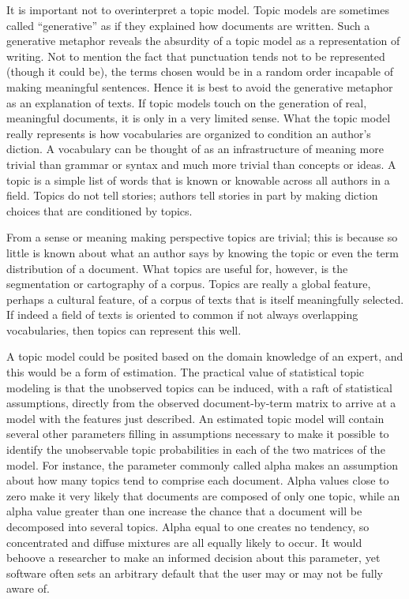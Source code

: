\documentclass[]{book}
\theoremstyle{definition}
\theoremstyle{definition}
\theoremstyle{definition}
\theoremstyle{remark}
\begin{document}
It is important not to overinterpret a topic model. Topic models are
sometimes called ``generative'' as if they explained how documents are
written. Such a generative metaphor reveals the absurdity of a topic
model as a representation of writing. Not to mention the fact that
punctuation tends not to be represented (though it could be), the terms
chosen would be in a random order incapable of making meaningful
sentences. Hence it is best to avoid the generative metaphor as an
explanation of texts. If topic models touch on the generation of real,
meaningful documents, it is only in a very limited sense. What the topic
model really represents is how vocabularies are organized to condition
an author's diction. A vocabulary can be thought of as an infrastructure
of meaning more trivial than grammar or syntax and much more trivial
than concepts or ideas. A topic is a simple list of words that is known
or knowable across all authors in a field. Topics do not tell stories;
authors tell stories in part by making diction choices that are
conditioned by topics.

From a sense or meaning making perspective topics are trivial; this is
because so little is known about what an author says by knowing the
topic or even the term distribution of a document. What topics are
useful for, however, is the segmentation or cartography of a corpus.
Topics are really a global feature, perhaps a cultural feature, of a
corpus of texts that is itself meaningfully selected. If indeed a field
of texts is oriented to common if not always overlapping vocabularies,
then topics can represent this well.

A topic model could be posited based on the domain knowledge of an
expert, and this would be a form of estimation. The practical value of
statistical topic modeling is that the unobserved topics can be induced,
with a raft of statistical assumptions, directly from the observed
document-by-term matrix to arrive at a model with the features just
described. An estimated topic model will contain several other
parameters filling in assumptions necessary to make it possible to
identify the unobservable topic probabilities in each of the two
matrices of the model. For instance, the parameter commonly called alpha
makes an assumption about how many topics tend to comprise each
document. Alpha values close to zero make it very likely that documents
are composed of only one topic, while an alpha value greater than one
increase the chance that a document will be decomposed into several
topics. Alpha equal to one creates no tendency, so concentrated and
diffuse mixtures are all equally likely to occur. It would behoove a
researcher to make an informed decision about this parameter, yet
software often sets an arbitrary default that the user may or may not be
fully aware of.
\end{document}
